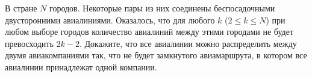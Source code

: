 \begin{exersize}
	В стране $N$ городов. Некоторые пары из них соединены беспосадочными двусторонними авиалиниями. Оказалось, что для любого $k$ ($2 \leqslant k \leqslant N$) при любом выборе городов количество авиалиний между этими городами не будет превосходить $2k-2$. Докажите, что все авиалинии можно распределить между двумя авиакомпаниями так, что не будет замкнутого авиамаршрута, в котором все авиалинии принадлежат одной компании.
\end{exersize}	 